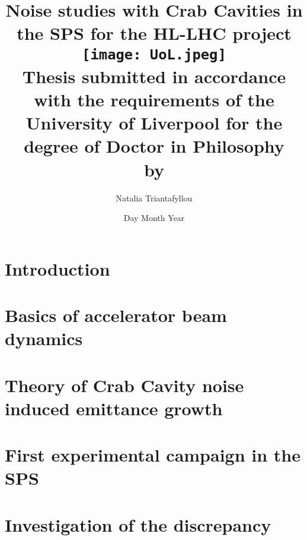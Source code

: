 \documentclass[12pt,twoside]{report} %
\begin{document}
\frontmatter
\title{
{Noise studies with Crab Cavities in the SPS for the HL-LHC project}\\
{\texttt{[image: UoL.jpeg]}} \\
{\large Thesis submitted in accordance with the requirements of the University of Liverpool for the degree of Doctor in Philosophy \\ by}
}
\author{ Natalia Triantafyllou}
\date{Day Month Year}
\maketitle
\newpage




\listoffigures
{}
\listoftables
{}

\newpage

\thispagestyle{plain} %

\listofsymbols
{}

\tableofcontents

\mainmatter

\chapter{Introduction}


\chapter{Basics of accelerator beam dynamics}


\chapter{Theory of Crab Cavity noise induced emittance growth}


\chapter{First experimental campaign in the SPS}


\chapter{Investigation of the discrepancy}

\end{document}
